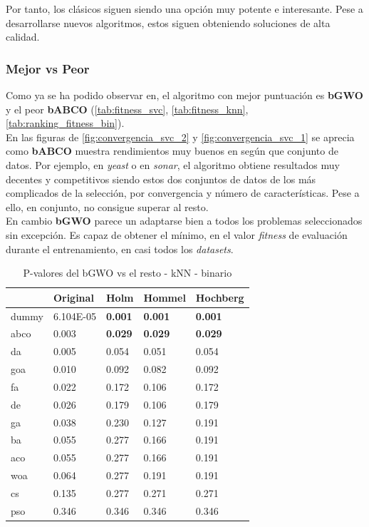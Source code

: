 Por tanto, los clásicos siguen siendo una opción muy potente e interesante. Pese a desarrollarse nuevos algoritmos, estos siguen obteniendo soluciones de alta calidad.

\subsubsection{Mejor vs Peor}
Como ya se ha podido observar en, el algoritmo con mejor puntuación es \textbf{bGWO} y el peor \textbf{bABCO} (\ref{tab:fitness_svc}, \ref{tab:fitness_knn}, \ref{tab:ranking_fitness_bin}). \\[6pt]
En las figuras de \ref{fig:convergencia_svc_2} y \ref{fig:convergencia_svc_1} se aprecia como \textbf{bABCO} muestra rendimientos muy buenos en según que conjunto de datos. Por ejemplo, en \textit{yeast} o en \textit{sonar}, el algoritmo obtiene resultados muy decentes y competitivos siendo estos dos conjuntos de datos de los más complicados de la selección, por convergencia y número de características. Pese a ello, en conjunto, no consigue superar al resto.\\[6pt]
En cambio \textbf{bGWO} parece un adaptarse bien a todos los problemas seleccionados sin excepción. Es capaz de obtener el mínimo, en el valor \textit{fitness} de evaluación durante el entrenamiento, en casi todos los \textit{datasets}.

\begin{table}[htp]
    \centering
    \begin{tabular}{lllll}
        \toprule
        {}    & Original  & Holm  & Hommel & Hochberg \\
        \midrule
        dummy & 6.104E-05 & \textbf{0.001} & \textbf{0.001}  & \textbf{0.001}    \\
        abco  & 0.003     & \textbf{0.029} & \textbf{0.029}  & \textbf{0.029}    \\
        da    & 0.005     & 0.054 & 0.051  & 0.054    \\
        goa   & 0.010     & 0.092 & 0.082  & 0.092    \\
        fa    & 0.022     & 0.172 & 0.106  & 0.172    \\
        de    & 0.026     & 0.179 & 0.106  & 0.179    \\
        ga    & 0.038     & 0.230 & 0.127  & 0.191    \\
        ba    & 0.055     & 0.277 & 0.166  & 0.191    \\
        aco   & 0.055     & 0.277 & 0.166  & 0.191    \\
        woa   & 0.064     & 0.277 & 0.191  & 0.191    \\
        cs    & 0.135     & 0.277 & 0.271  & 0.271    \\
        pso   & 0.346     & 0.346 & 0.346  & 0.346    \\
        \bottomrule
    \end{tabular}
    \caption{P-valores del bGWO vs el resto - kNN - binario}
    \label{tab:p-values_gwo_vs_rest_knn}
\end{table}

